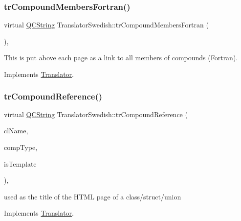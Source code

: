 \subsubsection{\texorpdfstring{trCompoundMembersFortran()}{trCompoundMembersFortran()}}
{\footnotesize\ttfamily virtual \mbox{\hyperlink{class_q_c_string}{Q\+C\+String}} Translator\+Swedish\+::tr\+Compound\+Members\+Fortran (\begin{DoxyParamCaption}{ }\end{DoxyParamCaption})\hspace{0.3cm}{\ttfamily [inline]}, {\ttfamily [virtual]}}

This is put above each page as a link to all members of compounds (Fortran). 

Implements \mbox{\hyperlink{class_translator}{Translator}}.

\mbox{\label{class_translator_swedish_a5f3a8950441caf0278816697a78b4b74}} 
\subsubsection{\texorpdfstring{trCompoundReference()}{trCompoundReference()}}
{\footnotesize\ttfamily virtual \mbox{\hyperlink{class_q_c_string}{Q\+C\+String}} Translator\+Swedish\+::tr\+Compound\+Reference (\begin{DoxyParamCaption}\item[{const char $\ast$}]{cl\+Name,  }\item[{\mbox{\hyperlink{class_class_def_ae70cf86d35fe954a94c566fbcfc87939}{Class\+Def\+::\+Compound\+Type}}}]{comp\+Type,  }\item[{bool}]{is\+Template }\end{DoxyParamCaption})\hspace{0.3cm}{\ttfamily [inline]}, {\ttfamily [virtual]}}

used as the title of the H\+T\+ML page of a class/struct/union 

Implements \mbox{\hyperlink{class_translator}{Translator}}.

\mbox{\label{class_translator_swedish_abc2e7283102c2c782c827e9a493fa176}} 
